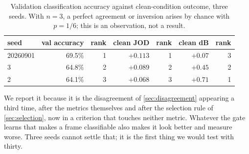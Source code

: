 \begin{table}[htbp]
\centering
\caption{Validation classification accuracy against clean-condition outcome,
three seeds. With $n = 3$, a perfect agreement or inversion arises by chance
with $p = 1/6$; this is an observation, not a result.}
\label{tab:rank}
\begin{tabular}{lrrrrrr}
\toprule
seed & val accuracy & rank & clean JOD & rank & clean dB & rank \\
\midrule
\num{20260901} & 69.5\% & 1 & $+0.113$ & 1 & $+0.07$ & 3 \\
3              & 64.8\% & 2 & $+0.089$ & 2 & $+0.45$ & 2 \\
2              & 64.1\% & 3 & $+0.068$ & 3 & $+0.71$ & 1 \\
\bottomrule
\end{tabular}
\end{table}

We report it because it is the disagreement of \cref{sec:disagreement} appearing
a third time, after the metrics themselves and after the selection rule of
\cref{sec:selection}, now in a criterion that touches neither metric. Whatever
the gate learns that makes a frame classifiable also makes it look better and
measure worse. Three seeds cannot settle that; it is the first thing we would
test with thirty.
